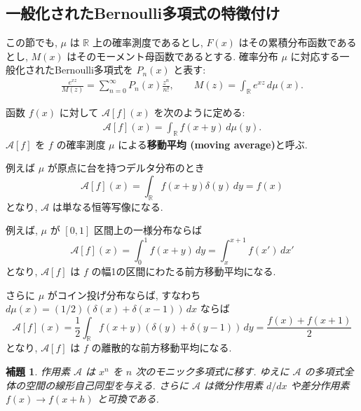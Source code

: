 \documentclass[12pt,twoside]{jarticle}
\newcommand\BF{\bfseries}
\newcommand\R{{\mathbb R}} %
\newcommand\A{{\mathscr A}}
\theoremstyle{jplain}
\newtheorem{lemma}[theorem]{補題}
\theoremstyle{jplain}
\theoremstyle{jplain}
\numberwithin{theorem}{section}
\numberwithin{equation}{section}
\numberwithin{figure}{section}
\numberwithin{table}{section}
\begin{document}

\subsection{一般化されたBernoulli多項式の特徴付け}
\label{sec:S}

この節でも,
$\mu$ は $\R$ 上の確率測度であるとし,
$F(x)$ はその累積分布函数であるとし,
$M(x)$ はそのモーメント母函数であるとする.
確率分布 $\mu$ に対応する一般化されたBernoulli多項式を $P_n(x)$ と表す:
\begin{align*}
  \frac{e^{xz}}{M(z)}=\sum_{n=0}^\infty P_n(x)\frac{z^n}{n!},
  \qquad
  M(z) = \int_\R e^{xz}\,d\mu(x).
\end{align*}

函数 $f(x)$ に対して $\A[f](x)$ を次のように定める:
\begin{align*}
  \A[f](x) = \int_\R f(x+y)\,d\mu(y).
\end{align*}
$\A[f]$ を $f$ の確率測度 $\mu$ による{\BF 移動平均 (moving average)}と呼ぶ.

例えば $\mu$ が原点に台を持つデルタ分布のとき
\begin{equation*}
  \A[f](x)=\int_\R f(x+y)\delta(y)\,dy = f(x)
\end{equation*}
となり, $\A$ は単なる恒等写像になる.

例えば, $\mu$ が $[0,1]$ 区間上の一様分布ならば
\begin{equation*}
  \A[f](x)
  = \int_0^1 f(x+y)\,dy
  = \int_{x}^{x+1} f(x')\,dx'
\end{equation*}
となり, $\A[f]$ は $f$ の幅1の区間にわたる前方移動平均になる.

さらに $\mu$ がコイン投げ分布ならば,
すなわち $d\mu(x)=(1/2)(\delta(x)+\delta(x-1))\,dx$ ならば
\begin{equation*}
  \A[f](x)
  =\frac12\int_\R f(x+y)(\delta(y)+\delta(y-1))\,dy
  =\frac{f(x)+f(x+1)}2
\end{equation*}
となり, $\A[f]$ は $f$ の離散的な前方移動平均になる.

\begin{lemma}
  \label{lemma:A}
  作用素 $\A$ は $x^n$ を $n$ 次のモニック多項式に移す.
  ゆえに $\A$ の多項式全体の空間の線形自己同型を与える.
  さらに $\A$ は微分作用素 $d/dx$ や差分作用素 $f(x)\to f(x+h)$
  と可換である.
\end{lemma}
\end{document}
